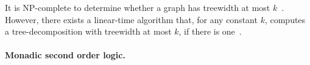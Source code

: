 \noindent It is NP-complete to determine whether a graph has treewidth at most $k$~\cite{Arnborg87}. However, there exists a linear-time algorithm that, for any constant $k$, computes a tree-decomposition with treewidth at most $k$, if there is one~\cite{Bodlaender96}.
%


\paragraph{Monadic second order logic.} %

